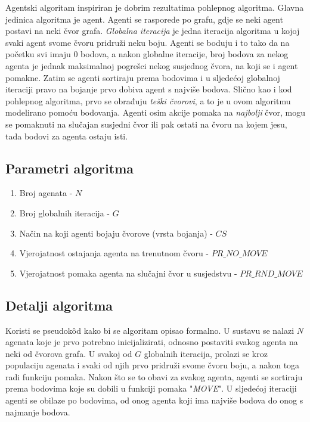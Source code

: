 \documentclass[times, utf8, diplomski, numeric]{fer}
\begin{document}
Agentski algoritam inspiriran je dobrim rezultatima pohlepnog algoritma. Glavna jedinica algoritma je agent. Agenti se rasporede po grafu, gdje se neki agent postavi na neki čvor grafa. \emph{Globalna iteracija} je jedna iteracija algoritma u kojoj svaki agent svome čvoru pridruži neku boju. Agenti se boduju i to tako da na početku svi imaju $0$ bodova, a nakon globalne iteracije, broj bodova za nekog agenta je jednak maksimalnoj pogrešci nekog susjednog čvora, na koji se i agent pomakne. Zatim se agenti sortiraju prema bodovima i u sljedećoj globalnoj iteraciji pravo na bojanje prvo dobiva agent s najviše bodova. Slično kao i kod pohlepnog algoritma, prvo se obrađuju \emph{teški čvorovi}, a to je u ovom algoritmu modelirano pomoću bodovanja. Agenti osim akcije pomaka na \emph{najbolji} čvor, mogu se pomaknuti na slučajan susjedni čvor ili pak ostati na čvoru na kojem jesu, tada bodovi za agenta ostaju isti.

\subsection{Parametri algoritma}

\begin{enumerate}
	\item Broj agenata - $N$
	\item Broj globalnih iteracija - $G$
	\item Način na koji agenti bojaju čvorove (vrsta bojanja) - $CS$
	\item Vjerojatnost ostajanja agenta na trenutnom čvoru - $PR\_NO\_MOVE$
	\item Vjerojatnost pomaka agenta na slučajni čvor u susjedstvu - $PR\_RND\_MOVE$
\end{enumerate}

\subsection{Detalji algoritma}

Koristi se pseudok\^{o}d kako bi se algoritam opisao formalno. U sustavu se nalazi $N$ agenata koje je prvo potrebno inicijalizirati, odnosno postaviti svakog agenta na neki od čvorova grafa. U svakoj od $G$ globalnih iteracija, prolazi se kroz populaciju agenata i svaki od njih prvo pridruži svome čvoru boju, a nakon toga radi funkciju pomaka. Nakon što se to obavi za svakog agenta, agenti se sortiraju prema bodovima koje su dobili u funkciji pomaka "\emph{MOVE}". U sljedećoj iteraciji agenti se obilaze po bodovima, od onog agenta koji ima najviše bodova do onog s najmanje bodova.
\end{document}
